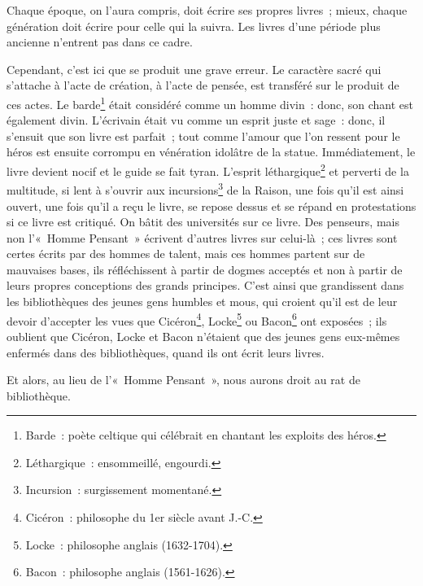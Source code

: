 	{Chaque époque, on l'aura compris, doit écrire ses propres livres~; mieux, chaque génération doit écrire pour celle qui la suivra. Les livres d'une période plus ancienne n'entrent pas dans ce cadre.
	
Cependant, c'est ici que se produit une grave erreur. Le caractère sacré qui s'attache à l'acte de création, à l'acte de pensée, est transféré sur le produit de ces actes. Le barde\footnote{Barde~: poète celtique qui célébrait en chantant les exploits des héros.} était considéré comme un homme divin~: donc, son chant est également divin. L'écrivain était vu comme un esprit juste et sage~: donc, il s'ensuit que son livre est parfait~; tout comme l'amour que l'on ressent pour le héros est ensuite corrompu en vénération idolâtre de la statue. Immédiatement, le livre devient nocif et le guide se fait tyran. L'esprit léthargique\footnote{Léthargique~: ensommeillé, engourdi.} et perverti de la multitude, si lent à s'ouvrir aux incursions\footnote{Incursion~: surgissement momentané.} de la Raison, une fois qu'il est ainsi ouvert, une fois qu'il a reçu le livre, se repose dessus et se répand en protestations si ce livre est critiqué. On bâtit des universités sur ce livre. Des penseurs, mais non l'«~Homme Pensant~» écrivent d'autres livres sur celui-là~; ces livres sont certes écrits par des hommes de talent, mais ces hommes partent sur de mauvaises bases, ils réfléchissent à partir de dogmes acceptés et non à partir de leurs propres conceptions des grands principes. C'est ainsi que grandissent dans les bibliothèques des jeunes gens humbles et mous, qui croient qu'il est de leur devoir d'accepter les vues que Cicéron\footnote{Cicéron~: philosophe du 1er siècle avant J.-C.}, Locke\footnote{Locke~: philosophe anglais (1632-1704).} ou Bacon\footnote{Bacon~: philosophe anglais (1561-1626).} ont exposées~; ils oublient que Cicéron, Locke et Bacon n'étaient que des jeunes gens eux-mêmes enfermés dans des bibliothèques, quand ils ont écrit leurs livres.

Et alors, au lieu de l'«~Homme Pensant~», nous aurons droit au rat de bibliothèque.
}

